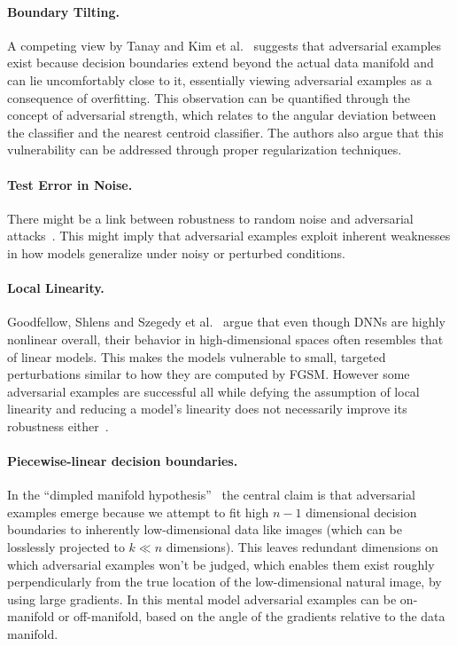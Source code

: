 \documentclass[a4paper, oneside]{discothesis}
\begin{document}
\paragraph{Boundary Tilting.} A competing view by Tanay and Kim et al.\ \cite{tanay2016boundary,kim2019bridging} suggests that adversarial examples exist because decision boundaries extend beyond the actual data manifold and can lie uncomfortably close to it, essentially viewing adversarial examples as a consequence of overfitting. This observation can be quantified through the concept of adversarial strength, which relates to the angular deviation between the classifier and the nearest centroid classifier. The authors also argue that this vulnerability can be addressed through proper regularization techniques.

\paragraph{Test Error in Noise.} There might be a link between robustness to random noise and adversarial attacks~\cite{fawzi2016robustness, lecuyer2019certified, cohen2019certified, ford2019adversarial}. This might imply that adversarial examples exploit inherent weaknesses in how models generalize under noisy or perturbed conditions.

\paragraph{Local Linearity.} Goodfellow, Shlens and Szegedy et al.\ \cite{goodfellow2014explaining, madry2017towards} argue that even though DNNs are highly nonlinear overall, their behavior in high-dimensional spaces often resembles that of linear models. This makes the models vulnerable to small, targeted perturbations similar to how they are computed by FGSM. However some adversarial examples are successful all while defying the assumption of local linearity and reducing a model's linearity does not necessarily improve its robustness either~\cite{athalye2018obfuscated}.

\paragraph{Piecewise-linear decision boundaries.} In the ``dimpled manifold hypothesis''~\cite{shamir2021dimpled} the central claim is that adversarial examples emerge because we attempt to fit high $n-1$ dimensional decision boundaries to inherently low-dimensional data like images (which can be losslessly projected to $k \ll n$ dimensions). This leaves redundant dimensions on which adversarial examples won't be judged, which enables them exist roughly perpendicularly from the true location of the low-dimensional natural image, by using large gradients. In this mental model adversarial examples can be on-manifold or off-manifold, based on the angle of the gradients relative to the data manifold.
\end{document}

